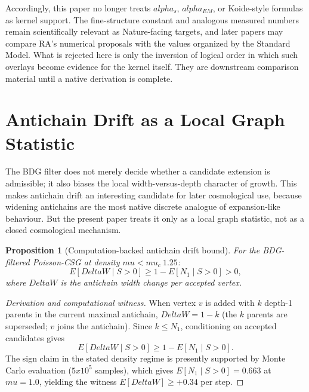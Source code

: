 \documentclass[11pt]{article}
\def\Delta{Delta}%
\def\mu{mu}%
\def\alpha{alpha}%
\def\mathrm#1{#1}%
\def\mathbb#1{#1}%
\def\times{x}%
\def\approx{~}%
\newtheorem{proposition}{Proposition}
\begin{document}
Accordingly, this paper no longer treats $\alpha_s$, $\alpha_{\mathrm{EM}}$, or Koide-style formulas as kernel support. The fine-structure constant and analogous measured numbers remain scientifically relevant as Nature-facing targets, and later papers may compare RA's numerical proposals with the values organized by the Standard Model. What is rejected here is only the inversion of logical order in which such overlays become evidence for the kernel itself. They are downstream comparison material until a native derivation is complete.

\section{Antichain Drift as a Local Graph Statistic}
\label{sec:drift}

The BDG filter does not merely decide whether a candidate extension is admissible; it also biases the local width-versus-depth character of growth. This makes antichain drift an interesting candidate for later cosmological use, because widening antichains are the most native discrete analogue of expansion-like behaviour. But the present paper treats it only as a local graph statistic, not as a closed cosmological mechanism.

\begin{proposition}[Computation-backed antichain drift bound]
\label{thm:drift}
For the BDG-filtered Poisson-CSG at density $\mu<\mu_c\approx 1.25$:
\begin{equation}
\mathbb{E}[\Delta W\mid S>0] \ge 1-\mathbb{E}[N_1\mid S>0] > 0,
\end{equation}
where $\Delta W$ is the antichain width change per accepted vertex.
\end{proposition}
\begin{proof}[Derivation and computational witness]
When vertex $v$ is added with $k$ depth-1 parents in the current maximal antichain, $\Delta W=1-k$ (the $k$ parents are superseded; $v$ joins the antichain). Since $k\le N_1$, conditioning on accepted candidates gives
\[
\mathbb{E}[\Delta W\mid S>0]\ge 1-\mathbb{E}[N_1\mid S>0].
\]
The sign claim in the stated density regime is presently supported by Monte Carlo evaluation ($5\times 10^5$ samples), which gives $\mathbb{E}[N_1\mid S>0]=0.663$ at $\mu=1.0$, yielding the witness $\mathbb{E}[\Delta W]\ge +0.34$ per step.
\end{proof}
\end{document}
